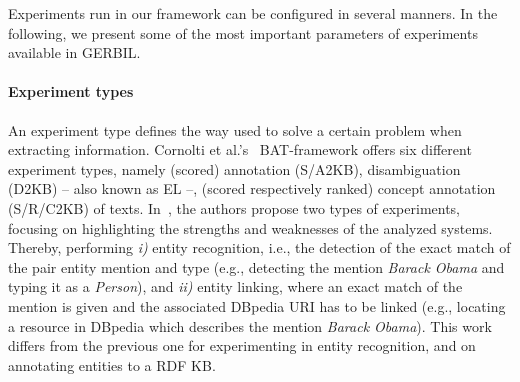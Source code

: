
Experiments run in our framework can be configured in several manners. In the following, we present some of the most important parameters of experiments available in GERBIL. 

\paragraph{Experiment types}
An experiment type defines the way used to solve a certain problem when extracting information.
Cornolti et al.'s~\cite{cornolti} BAT-framework offers six different experiment types, namely (scored) annotation (S/A2KB), disambiguation (D2KB) -- also known as \ac{EL} --, (scored respectively ranked) concept annotation (S/R/C2KB) of texts. 
In~\cite{rizzo2014}, the authors propose two types of experiments, focusing on highlighting the strengths and weaknesses of the analyzed systems.
Thereby, performing \textit{i)} entity recognition, i.e., the detection of the exact match of the pair entity mention and type (e.g., detecting the mention \textit{Barack Obama} and typing it as a \textit{Person}), and \textit{ii)} entity linking, where an exact match of the mention is given and the associated DBpedia URI has to be linked (e.g., locating a resource in DBpedia which describes the mention \textit{Barack Obama}).
This work differs from the previous one for experimenting in entity recognition, and on annotating entities to a \ac{RDF} \ac{KB}.


